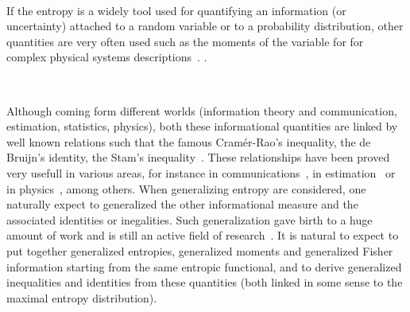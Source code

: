 \documentclass[english,sort&compress]{elsarticle}
\theoremstyle{definition}
\theoremstyle{plain}
\theoremstyle{plain}
\begin{document}
\

If  the  entropy is  a  widely  tool used  for  quantifying  an information  (or
uncertainty) attached  to a  random variable or  to a  probability distribution,
other  quantities are  very  often used  such  as the  moments  of the  variable
 for  for  complex  physical
systems   descriptions~\cite{Fri04,  VigBer03,  RomAng99,   RomSan06,  SanGon06,
  TorLop15}.  .

\

Although  coming form  different worlds  (information theory  and communication,
estimation, statistics, physics), both these informational quantities are linked
by well known  relations such that the famous  Cram\'er-Rao's inequality, the de
Bruijn's  identity,  the   Stam's  inequality~\cite{CovTho06,  Sta59,  DemCov91,
  GuoSha05}.   These relationships  have  been proved  very  usefull in  various
areas,  for  instance  in  communications~\cite{Sta59, DemCov91,  CovTho06},  in
estimation~\cite{Kay93} or in physics~\cite{FolSit97, Sen11}, among others. When
generalizing  entropy are considered,  one naturally  expect to  generalized the
other informational measure and  the associated identities or inegalities.  Such
generalization gave birth to a huge amount  of work and is still an active field
of research~\cite{Vaj73,  Boe77, Ham78, BoeVan80,  BurRao82, LutYan04, LutYan05,
  LutYan07, LutLv12, Ber12:06_1, Ber12:06_2, Ber13, Ber13:08}.  It is natural to
expect  to   put  together   generalized  entropies,  generalized   moments  and
generalized Fisher  information starting from the same  entropic functional, and
to derive  generalized inequalities and  identities from these  quantities (both
linked in some sense to the maximal entropy distribution).

\
\end{document}
